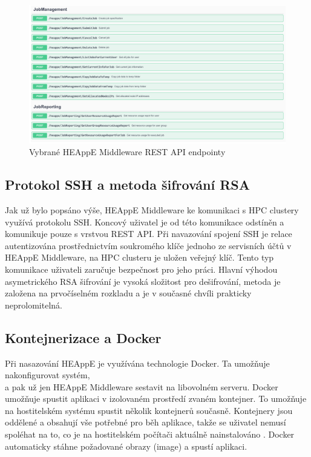\begin{figure}
	\centering
	\includegraphics[width=1\textwidth]{Figures/swagger-ui.pdf}
	\caption{Vybrané HEAppE Middleware REST API endpointy}
	\label{fig:swagger}
\end{figure}

\newpage

\subsection{Protokol SSH a metoda šifrování RSA}
Jak už bylo popsáno výše, HEAppE Middleware ke komunikaci s HPC clustery využívá protokolu SSH. Koncový uživatel je od této komunikace odstíněn a komunikuje pouze s vrstvou REST API. Při navazování spojení SSH je relace autentizována prostřednictvím soukromého klíče jednoho ze servisních účtů v HEAppE Middleware, na HPC clusteru je uložen veřejný klíč. Tento typ komunikace uživateli zaručuje bezpečnost pro jeho práci. Hlavní výhodou asymetrického RSA šifrování je vysoká složitost pro dešifrování, metoda je založena na prvočíselném rozkladu a je v současné chvíli prakticky neprolomitelná.

\subsection{Kontejnerizace a Docker}
Při nasazování HEAppE je využívána technologie Docker. Ta umožňuje nakonfigurovat systém, \\a pak už jen HEAppE Middleware sestavit na libovolném serveru. Docker umožňuje spustit aplikaci v izolovaném prostředí zvaném kontejner. To umožňuje na hostitelském systému spustit několik kontejnerů současně. Kontejnery jsou oddělené a obsahují vše potřebné pro běh aplikace, takže se uživatel nemusí spoléhat na to, co je na hostitelském počítači aktuálně nainstalováno \cite{Ued4tuEOQL0cOIeN}. Docker automaticky stáhne požadované obrazy (image) a spustí aplikaci. 

